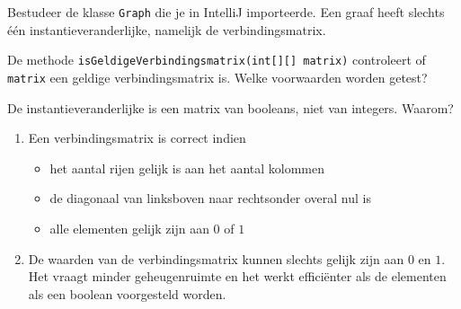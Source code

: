 \begin{oef}
\label{oef:BFSpapier}
\papier \code Bestudeer de klasse \verb/Graph/ die je in IntelliJ importeerde. Een graaf heeft slechts  één instantieveranderlijke, namelijk de verbindingsmatrix.
\begin{oefenumerate}
\item De methode \verb/isGeldigeVerbindingsmatrix(int[][] matrix)/ controleert of \verb/matrix/ een geldige verbindingsmatrix is. Welke voorwaarden worden getest?
\item De instantieveranderlijke is een matrix van booleans, niet van integers. Waarom?
\end{oefenumerate}

\begin{opl}
\begin{enumerate}
\item Een verbindingsmatrix is correct indien 
\begin{itemize}
\item het aantal rijen gelijk is aan het aantal kolommen
\item de diagonaal van linksboven naar rechtsonder overal nul is 
\item alle elementen gelijk zijn aan $0$ of $1$
\end{itemize}
\item De waarden van de verbindingsmatrix kunnen slechts gelijk zijn aan $0$ en $1$. Het vraagt minder geheugenruimte en het werkt efficiënter als de elementen als een boolean voorgesteld worden.
\end{enumerate}
\end{opl}

\end{oef}

